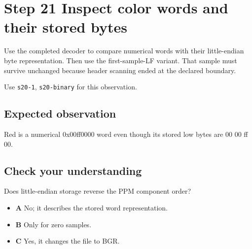 \section{Step 21 Inspect color words and their stored bytes}\label{ppm-s21}

Use the completed decoder to compare numerical words with their little-endian byte representation. Then use the first-sample-LF variant. That sample must survive unchanged because header scanning ended at the declared boundary.

Use \texttt{s20-1}, \texttt{s20-binary} for this observation.

\subsection{Expected observation}
Red is a numerical 0x00ff0000 word even though its stored low bytes are 00 00 ff 00.

\subsection{Check your understanding}
Does little-endian storage reverse the PPM component order?

\begin{itemize}
  \item \textbf{A} No; it describes the stored word representation.
  \item \textbf{B} Only for zero samples.
  \item \textbf{C} Yes, it changes the file to BGR.
\end{itemize}
